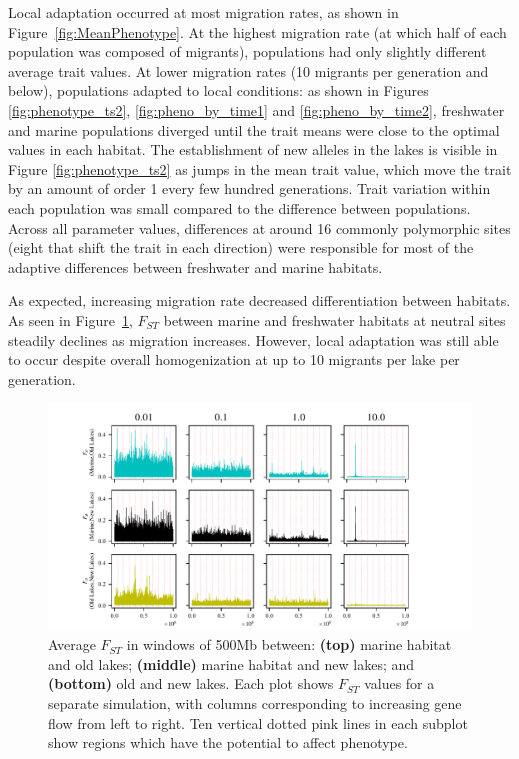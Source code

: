 \documentclass{article}
\begin{document}
Local adaptation occurred at most migration rates,
as shown in Figure~\ref{fig:MeanPhenotype}.
At the highest migration rate (at which half of each population was composed of migrants),
populations had only slightly different average trait values.
At lower migration rates (10 migrants per generation and below),
populations adapted to local conditions:
as shown in Figures \ref{fig:phenotype_ts2},
\ref{fig:pheno_by_time1} and \ref{fig:pheno_by_time2},
freshwater and marine populations diverged
until the trait means were close to the optimal values in each habitat. 
The establishment of new alleles in the lakes is visible in Figure \ref{fig:phenotype_ts2}
as jumps in the mean trait value,
which move the trait by an amount of order 1 every few hundred generations.
Trait variation within each population was small compared to the difference between populations.
Across all parameter values, differences at around 16 commonly polymorphic sites 
(eight that shift the trait in each direction)
were responsible for most of the adaptive differences between freshwater and marine habitats.

As expected, increasing migration rate decreased differentiation between habitats. 
As seen in Figure~\ref{fig:Fst}, 
$F_{ST}$ between marine and freshwater habitats 
at neutral sites steadily declines as migration increases. 
However, local adaptation was still able to occur despite overall homogenization 
at up to 10 migrants per lake per generation.

\begin{figure}
	\begin{center}
  		\includegraphics{Final_Plots/Fst_Genome.pdf}
  		\caption{
		Average $F_{ST}$ in windows of 500Mb between:
        \textbf{(top)} marine habitat and old lakes;
        \textbf{(middle)} marine habitat and new lakes; and
        \textbf{(bottom)} old and new lakes.
        Each plot shows $F_{ST}$ values for a separate simulation,
        with columns corresponding to increasing gene flow from left to right.
		Ten vertical dotted pink lines in each subplot 
        show regions which have the potential to affect phenotype.
     } \label{fig:Fst}
	\end{center}
\end{figure}
\end{document}
